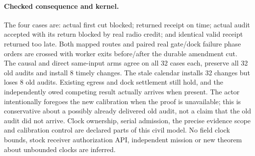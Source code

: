 \documentclass{article}
\begin{document}
\paragraph{Checked consequence and kernel.}
The four cases are: actual first cut blocked; returned receipt
on time; actual audit accepted with its return blocked by real
radio credit; and identical valid receipt returned too late.
Both mapped routes and paired real gate/dock failure phase
orders are crossed with worker exits before/after the durable
amendment cut. The causal and direct same-input arms agree
on all 32 cases each, preserve all 32 old audits and install 8
timely changes. The stale calendar installs 32 changes but loses
8 old audits. Existing egress and dock settlement still hold,
and the independently owed competing result actually arrives
when present. The actor intentionally foregoes the new
calibration when the proof is unavailable; this is conservative
about a possibly already delivered old audit, not a claim that
the old audit did not arrive. Clock ownership, serial admission,
the precise evidence scope and calibration control are declared
parts of this civil model. No field clock bounds, stock receiver
authorization API, independent mission or new theorem about
unbounded clocks are inferred.
\end{document}
